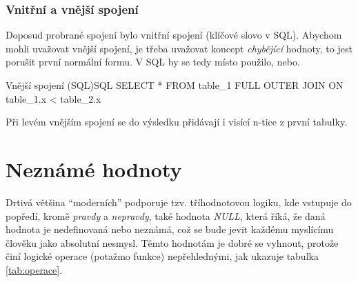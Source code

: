 \subsubsection{Vnitřní a vnější spojení}
Doposud probrané spojení bylo vnitřní spojení (klíčové slovo v SQL). Abychom mohli uvažovat vnější spojení, je třeba uvažovat koncept \textit{chybějící} hodnoty, to jest porušit první normální formu. V SQL by se tedy místo použilo, nebo.
\begin{upcode}{Vnější spojení (SQL)}{}{SQL}
SELECT * FROM table_1 FULL OUTER JOIN ON table_1.x < table_2.x
\end{upcode}
Při levém vnějším spojení se do výsledku přidávají i visící n-tice z první tabulky.

\section{Neznámé hodnoty}
Drtivá většina \enquote{moderních}  podporuje tzv. tříhodnotovou logiku, kde vstupuje do popředí, kromě \textit{pravdy} a \textit{nepravdy}, také hodnota \textit{NULL}, která říká, že daná hodnota je nedefinovaná nebo neznámá, což se bude jevit každému myslícímu člověku jako absolutní nesmysl. Těmto hodnotám je dobré se vyhnout, protože činí logické operace (potažmo funkce) nepřehlednými, jak ukazuje tabulka \ref{tab:operace}.

